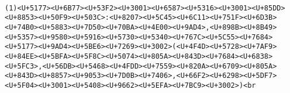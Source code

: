 \documentclass[
]{article}
\begin{document}
\begin{verbatim}
                                                                                                                                                                                                                                                                                                                                                                                                                                                                                                                                                                                                                                                                                                                                                                                                                                                                                                                                                                                                                                                                                                                                                                                                                                                                                                                                                                                                                                                                                                                                                                                                                                                                                                                                                                                                                                                                                                                                                                                                                                                                                                                                                                                                                                                                                                                                                                                                                                                                                                                                                                                                                                                                                      (1)<U+5177><U+6B77><U+53F2><U+3001><U+6587><U+5316><U+3001><U+85DD><U+8853><U+50F9><U+503C>:<U+8207><U+5C45><U+6C11><U+751F><U+6D3B><U+74B0><U+5883><U+7D50><U+70BA><U+4E00><U+9AD4>,<U+898B><U+8B49><U+5357><U+9580><U+5916><U+5730><U+5340><U+767C><U+5C55><U+7684><U+5177><U+9AD4><U+5BE6><U+7269><U+3002>(<U+4F4D><U+5728><U+7AF9><U+84EE><U+5BFA><U+5F8C><U+5074><U+805A><U+843D><U+7684><U+6838><U+5FC3>,<U+56DB><U+5468><U+4FDD><U+7559><U+820A><U+6709><U+805A><U+843D><U+8857><U+9053><U+7D0B><U+7406>,<U+66F2><U+6298><U+5DF7><U+5F04><U+3001><U+5408><U+9662><U+5EFA><U+7BC9><U+3002>)<br 
\end{verbatim}
\end{document}
